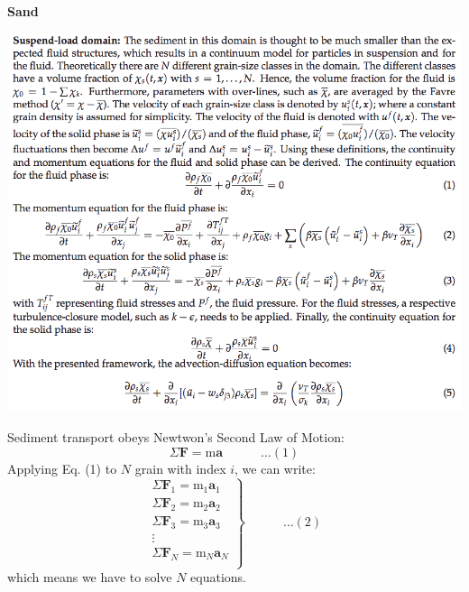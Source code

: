 \documentclass{beamer}
\newcommand{\topline}{%
 \tikz[remember picture,overlay] {%
   \draw[black!100] ([yshift=-1cm]current page.north west)
            --([yshift=-1cm,xshift=\paperwidth]current page.north west);}}
\begin{document}
\begin{frame}[c]
\begin{center}
\textbf{\huge \color{DarkFern}Sand}
\end{center}
\end{frame}
\begin{frame}[c]
  \begin{center}
  \vspace*{-0.6cm}\hspace*{-0.5cm}  {\includegraphics[scale=0.39]{Honeymoont.png}}
  \end{center}
\end{frame}

\begin{frame}[c]%
     {Sediment transport  obeys Newtwon's Second Law of Motion:
        \begin{equation*}
          \Sigma \mathbf{F} = \textrm{m} \mathbf{a} \quad\quad\quad \ldots(1)
        \end{equation*}}
     {Applying Eq. (1) to $N$ grain with index $i$,  we can write:
        \begin{equation*}
        \left.
  \begin{array}{c}
   \Sigma \mathbf{F}_1 = \textrm{m}_1 \mathbf{a}_1 \\
   \Sigma \mathbf{F}_2 = \textrm{m}_2 \mathbf{a}_2  \\
   \Sigma \mathbf{F}_3 = \textrm{m}_3 \mathbf{a}_3 \\
            \vdots \\
    \Sigma \mathbf{F}_N = \textrm{m}_N \mathbf{a}_N \\
   \end{array} \right\} \quad \quad \quad \dots(2)
                 \end{equation*}
        which means we have to solve $N$ equations.}
\end{frame}
\end{document}
